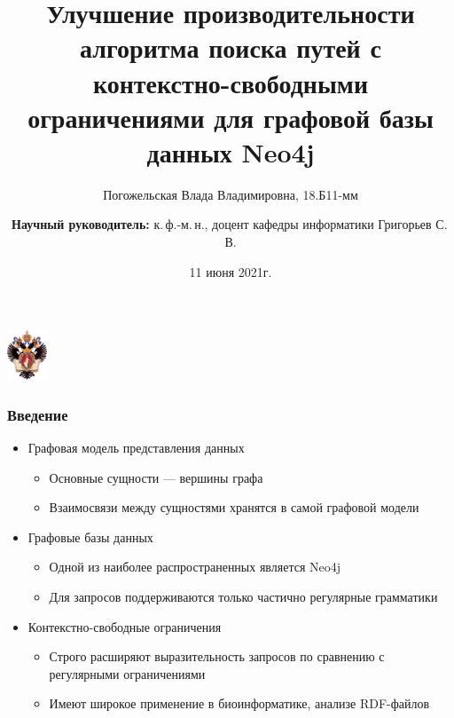 \documentclass{beamer}
\title[]{Улучшение производительности алгоритма поиска путей с контекстно-свободными ограничениями для графовой базы данных Neo4j}
\institute[СПбГУ]{
Санкт-Петербургский государственный университет \\
Кафедра системного программирования }
\author[Погожельская Влада]{Погожельская Влада Владимировна, 18.Б11-мм \\
  \and  
    {\bfseries Научный руководитель:} к.\,ф.-м.\,н., доцент кафедры информатики Григорьев С.\,В. \\ 
}
\date{11 июня 2021г.}
\begin{document}
{
\begin{frame}
  \begin{center}
  {\includegraphics[width=1.2cm]{pictures/SPbGU_Logo.png}}
  \end{center}
  \titlepage
\end{frame}
}

\begin{frame}[fragile]
  \transwipe[direction=90]
  \frametitle{Введение}
  \begin{itemize}
      \item Графовая модель представления данных
      \begin{itemize}
        \item Основные сущности --- вершины графа
        \item Взаимосвязи между сущностями хранятся в самой графовой модели
      \end{itemize}
    \item Графовые базы данных
\begin{itemize}
    \item Одной из наиболее распространенных является Neo4j
    \item Для запросов поддерживаются только частично регулярные грамматики
\end{itemize} 
\item Контекстно-свободные ограничения
\begin{itemize}
    \item Строго расширяют выразительность запросов по сравнению с регулярными ограничениями
    \item Имеют широкое применение в биоинформатике, анализе RDF-файлов
\end{itemize}
\end{itemize}
\end{frame}
\end{document}
